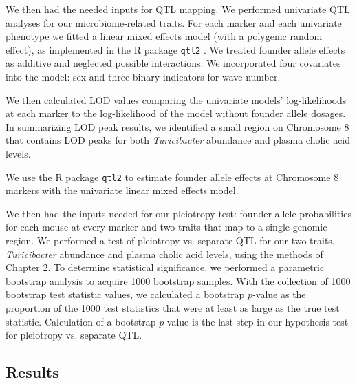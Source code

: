 \documentclass[oneside]{book}\usepackage[]{graphicx}\usepackage[]{color}
\begin{document}
We then had the needed inputs for QTL mapping. 
We performed univariate QTL analyses for our microbiome-related 
traits. 
For each marker and each univariate phenotype we fitted a linear mixed effects model (with a polygenic random effect), 
as implemented in the R package \texttt{qtl2} \citep{broman2019rqtl2}. 
We treated founder allele effects as additive and neglected possible interactions. 
We incorporated four covariates into the model: sex and three binary indicators for wave number. 



We then calculated LOD values comparing the univariate models' 
log-likelihoods at each marker to the log-likelihood of 
the model without founder allele dosages. 
In summarizing LOD peak results, we identified a 
small region on Chromosome 8 that contains LOD peaks for both 
\emph{Turicibacter} abundance and plasma cholic acid levels.



We use the R package \texttt{qtl2} to estimate founder allele effects 
at Chromosome 8 markers with
the univariate linear mixed effects model. 



We then had the inputs needed for our pleiotropy test: 
founder allele probabilities for each mouse at every 
marker and two traits that map to a single genomic region. 
We performed a test of pleiotropy vs. separate QTL for our two traits, 
\emph{Turicibacter} abundance and plasma cholic acid levels, 
using the methods of Chapter 2. 
To determine statistical significance, we performed a 
parametric bootstrap analysis to acquire 1000 bootstrap samples. 
With the collection of 1000 bootstrap test statistic values, we calculated a 
bootstrap $p$-value as the proportion of the 1000 test statistics
that were at least as large as the true test statistic. 
Calculation of a bootstrap $p$-value is the last step in our hypothesis test for pleiotropy vs. separate QTL.



\subsection{Results}
\end{document}
